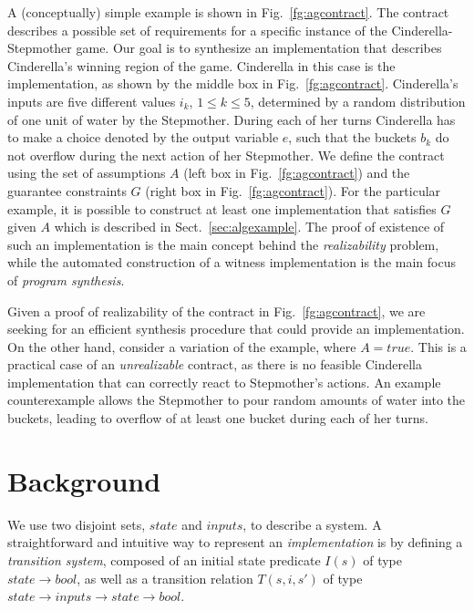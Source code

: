 A (conceptually) simple example is shown in Fig.~\ref{fg:agcontract}. The contract describes a possible set of requirements for a specific instance of the Cinderella-Stepmother game. %
Our goal is to synthesize an implementation that describes Cinderella's winning region of the game. Cinderella in this case is the implementation, as shown by the middle box in Fig.~\ref{fg:agcontract}. Cinderella's inputs are five different values $i_k$, $1 \leq k \leq 5$, determined by a random distribution of one unit of water by the Stepmother. During each of her turns Cinderella has to make a choice denoted by the output variable $e$, such that the buckets $b_k$ do not overflow during the next action of her Stepmother. We define the contract using the set of assumptions $A$ (left box in Fig.~\ref{fg:agcontract}) and the guarantee constraints $G$ (right box in Fig.~\ref{fg:agcontract}). For the particular example, it is possible to construct at least one implementation that satisfies $G$ given $A$ which is described in Sect.~\ref{sec:algexample}.
The proof of existence of such an implementation is the main concept behind the \emph{realizability} problem, while the automated construction of a witness implementation is the main focus of \emph{program synthesis}.

Given a proof of realizability of the contract in Fig.~\ref{fg:agcontract}, we are seeking for an efficient synthesis procedure that could provide an implementation. On the other hand, consider a variation of the example, where $A = \mathit{true}$. This is a practical case of an \emph{unrealizable} contract, as there is no feasible Cinderella implementation that can correctly react to Stepmother's actions. An example counterexample allows the Stepmother to pour random amounts of water into the buckets, leading to overflow of at least one bucket during each of her turns.

\section{Background}
\label{sec:background}
We use two disjoint sets, $state$ and $inputs$, to describe a system.
A straightforward and intuitive way to represent an \emph{implementation} is by
defining a \emph{transition system}, composed of an initial state
predicate $I(s)$ of type $state \to bool$, as well as a transition relation
$T(s,i,s')$ of type $state \to inputs \to state \to bool$.

